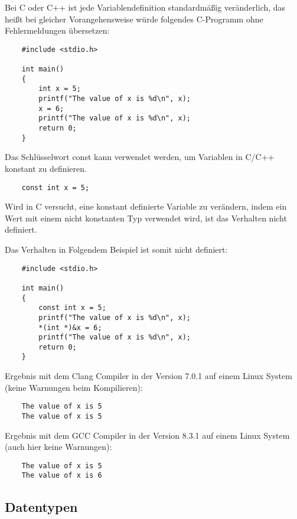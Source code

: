 Bei C oder C++ ist jede Variablendefinition standardmäßig veränderlich, das heißt bei gleicher Vorangehensweise würde folgendes C-Programm ohne Fehlermeldungen übersetzen:

\begin{lstlisting}
    #include <stdio.h>

    int main()
    {
        int x = 5;
        printf("The value of x is %d\n", x);
        x = 6;
        printf("The value of x is %d\n", x);
        return 0;
    }    
\end{lstlisting}

Das Schlüsselwort \glqq const\grqq{} kann verwendet werden, um Variablen in C/C++ konstant zu definieren.

\begin{lstlisting}
    const int x = 5;
\end{lstlisting}

Wird in C versucht, eine konstant definierte Variable zu verändern, indem ein Wert mit einem nicht konstanten Typ verwendet wird, ist das Verhalten nicht definiert. \cite[p.~87]{ISO:9899:2017}

Das Verhalten in Folgendem Beispiel ist somit nicht definiert:

\begin{lstlisting}
    #include <stdio.h>

    int main()
    {
        const int x = 5;
        printf("The value of x is %d\n", x);
        *(int *)&x = 6;
        printf("The value of x is %d\n", x);
        return 0;
    }
\end{lstlisting}

Ergebnis mit dem Clang Compiler in der Version 7.0.1 auf einem Linux System (keine Warnungen beim Kompilieren):

\begin{lstlisting}
    The value of x is 5
    The value of x is 5
\end{lstlisting}

Ergebnis mit dem GCC Compiler in der Version 8.3.1 auf einem Linux System (auch hier keine Warnungen):

\begin{lstlisting}
    The value of x is 5
    The value of x is 6
\end{lstlisting}


\subsection{Datentypen}

